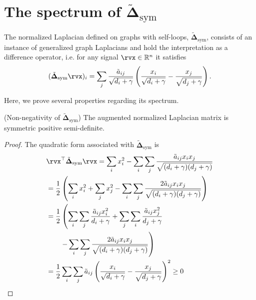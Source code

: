\section{The spectrum of $\tilde{\boldsymbol{\Delta}}_{\text{sym}}$}

The normalized Laplacian defined on graphs with self-loops, $\tilde{\boldsymbol{\Delta}}_{\text{sym}}$, consists of an instance of generalized graph Laplacians and hold the interpretation as a difference operator, i.e. for any signal $\rvx \in \mathbb{R}^n$ it satisfies 
\begin{equation}
(\tilde{\boldsymbol{\Delta}}_{\text{sym}} \rvx)_i = \sum_{j} \frac{\tilde{a}_{ij}}{\sqrt{d_i + \gamma}} \left(\frac{x_i}{\sqrt{d_i + \gamma}} - \frac{x_j}{\sqrt{d_j + \gamma}}\right). \nonumber
\end{equation}

Here, we prove several properties regarding its spectrum.

\begin{lemma}
(Non-negativity of $\tilde{\boldsymbol{\Delta}}_{\text{sym}}$) The augmented normalized Laplacian matrix is symmetric positive semi-definite.
\end{lemma}
\begin{proof}

The quadratic form associated with $\tilde{\boldsymbol{\Delta}}_{\text{sym}}$ is
\begin{align}
    & \rvx^\top\tilde{\boldsymbol{\Delta}}_{\text{sym}}\rvx  = \sum_i x_i^2 - \sum_i \sum_j\frac{\tilde{a}_{ij} x_i x_j}{\sqrt{(d_i + \gamma)(d_j + \gamma)}} \nonumber \\
    & = \frac{1}{2} \left( \sum_i x_i^2 + \sum_j x_j^2  - \sum_i \sum_j \frac{2\tilde{a}_{ij} x_i x_j}{\sqrt{(d_i + \gamma)(d_j + \gamma)}}\right) \nonumber \\
    & = \frac{1}{2} \left(\sum_i \sum_j \frac{\tilde{a}_{ij} x_i^2}{d_i + \gamma} + \sum_j \sum_i \frac{\tilde{a}_{ij} x_j^2}{d_j + \gamma} \right.
     \nonumber \\ & \left. \quad \quad - \sum_i \sum_j  \frac{2\tilde{a}_{ij} x_i x_j}{\sqrt{(d_i + \gamma)(d_j + \gamma)}}\right) \nonumber \\
    &  = \frac{1}{2} \sum_i \sum_j \tilde{a}_{ij}\left(\frac{x_i}{\sqrt{d_i + \gamma}} - \frac{x_j}{\sqrt{d_j + \gamma}}\right)^2 \geq 0 \label{eq:norm_laplacian_self_loops}
\end{align}


\end{proof}

